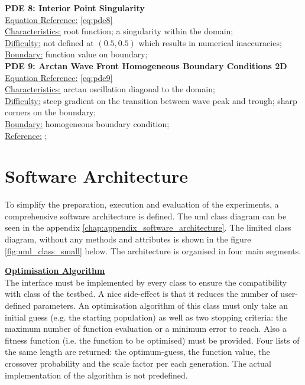 \documentclass[./\jobname.tex]{subfiles}
\begin{document}
\textbf{PDE 8: Interior Point Singularity} \\
\underline{Equation Reference:} \eqref{eq:pde8} \\
\underline{Characteristics:} root function; a singularity within the domain; \\
\underline{Difficulty:} not defined at $(0.5, 0.5)$ which results in numerical inaccuracies; \\
\underline{Boundary:} function value on boundary; \\

\textbf{PDE 9: Arctan Wave Front Homogeneous Boundary Conditions 2D} \\
\underline{Equation Reference:} \eqref{eq:pde9} \\
\underline{Characteristics:} arctan oscillation diagonal to the domain;  \\
\underline{Difficulty:} steep gradient on the transition between wave peak and trough; sharp corners on the boundary; \\
\underline{Boundary:} homogeneous boundary condition; \\
\underline{Reference:} \cite{mitchell_nist_2018}; \\


\section{Software Architecture}
\label{chap:software_architecutre}

To simplify the preparation, execution and evaluation of the experiments, a comprehensive software architecture is defined. The \gls{uml} class diagram can be seen in the appendix \ref{chap:appendix_software_architecture}. The limited class diagram, without any methods and attributes is shown in the figure \ref{fig:uml_class_small} below. The architecture is organised in four main segments. 

\large \underline{\textbf{Optimisation Algorithm}} \\
The  interface must be implemented by every  class to ensure the compatibility with  class of the testbed. A nice side-effect is that it reduces the number of user-defined parameters. An optimisation algorithm of this class must only take an initial guess (e.g. the starting population) as well as two stopping criteria: the maximum number of function evaluation or a minimum error to reach. Also a fitness function (i.e. the function to be optimised) must be provided. Four lists of the same length are returned: the optimum-guess, the function value, the crossover probability and the scale factor per each generation. The actual implementation of the algorithm is not predefined. 
\end{document}
